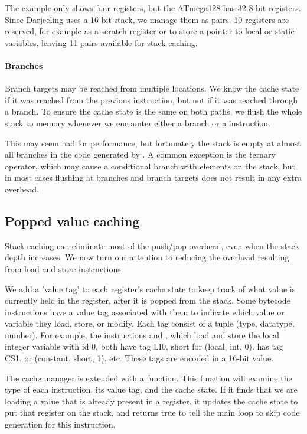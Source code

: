 The example only shows four registers, but the ATmega128 has 32 8-bit registers. Since Darjeeling uses a 16-bit stack, we manage them as pairs. 10 registers are reserved, for example as a scratch register or to store a pointer to local or static variables, leaving 11 pairs available for stack caching.

\paragraph{Branches} Branch targets may be reached from multiple locations. We know the cache state if it was reached from the previous instruction, but not if it was reached through a branch. To ensure the cache state is the same on both paths, we flush the whole stack to memory whenever we encounter either a branch or a  instruction. 

This may seem bad for performance, but fortunately the stack is empty at almost all branches in the code generated by . A common exception is the ternary  \mycode{:} operator, which may cause a conditional branch with elements on the stack, but in most cases flushing at branches and branch targets does not result in any extra overhead.

\subsection{Popped value caching}
\label{sec-optimisations-popped-value-caching}
Stack caching can eliminate most of the push/pop overhead, even when the stack depth increases. We now turn our attention to reducing the overhead resulting from load and store instructions.



We add a 'value tag' to each register's cache state to keep track of what value is currently held in the register, after it is popped from the stack. Some bytecode instructions have a value tag associated with them to indicate which value or variable they load, store, or modify. Each tag consist of a tuple (type, datatype, number). For example, the instructions  and , which load and store the local integer variable with id 0, both have tag LI0, short for (local, int, 0).  has tag CS1, or (constant, short, 1), etc. These tags are encoded in a 16-bit value.

The cache manager is extended with a  function. This function will examine the type of each instruction, its value tag, and the cache state. If it finds that we are loading a value that is already present in a register, it updates the cache state to put that register on the stack, and returns true to tell the main loop to skip code generation for this instruction.

